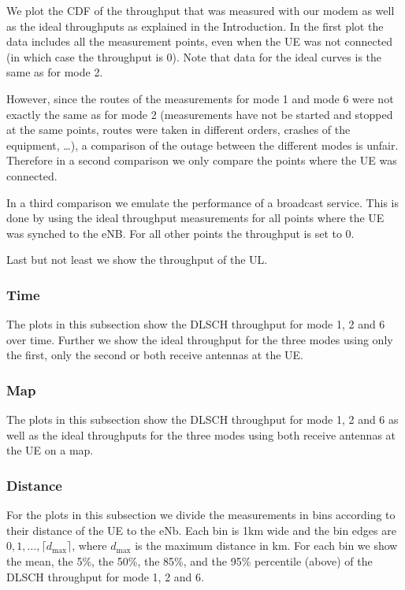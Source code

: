 \documentclass[a4paper,10pt]{article}
\begin{document}
We plot the CDF of the throughput that was measured with our modem as well as the ideal throughputs as explained in the Introduction. In the first plot the data includes all the measurement points, even when the UE was not connected (in which case the throughput is 0). Note that data for the ideal curves is the same as for mode 2. 

However, since the routes of the measurements for mode 1 and mode 6 were not exactly the same as for mode 2 (measurements have not be started and stopped at the same points, routes were taken in different orders, crashes of the equipment, \ldots), a comparison of the outage between the different modes is unfair. Therefore in a second comparison we only compare the points where the UE was connected. 

In a third comparison we emulate the performance of a broadcast service. This is done by using the ideal throughput measurements for all points where the UE was synched to the eNB. For all other points the throughput is set to 0.

Last but not least we show the throughput of the UL.


\subsubsection{Time}

The plots in this subsection show the DLSCH throughput for mode 1, 2 and 6 over time. Further we show the ideal throughput for the three modes using only the first, only the second or both receive antennas at the UE.


\subsubsection{Map}

The plots in this subsection show the DLSCH throughput for mode 1, 2 and 6 as well as the ideal throughputs for the three modes using  both receive antennas at the UE on a map.

\subsubsection{Distance}

For the plots in this subsection we divide the measurements in bins according to their distance of the UE to the eNb. Each bin is 1km wide and the bin edges are $0, 1, \ldots, \lceil d_{\max} \rceil$, where $d_{\max}$ is the maximum distance in km. For each bin we show the mean, the 5\%, the 50\%, the 85\%, and the 95\% percentile (above) of the DLSCH throughput for mode 1, 2 and 6. 
\end{document}
